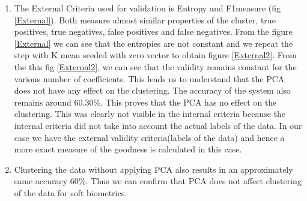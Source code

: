 \documentclass[conference]{IEEEtran}
\begin{document}
\begin{enumerate}
\item The External Criteria used for validation is Entropy and F1measure (fig \ref{External}).  Both measure almost similar properties of the cluster, true positives, true negatives, false positives and false negatives. From the figure \ref{External} we can see that the entropies are not constant and we repeat the step with K mean seeded with zero vector to obtain figure \ref{External2}. From the this fig \ref{External2}, we can see that the validity remains constant for the various number of coefficients. This leads us to understand that the PCA does not have any effect on the clustering. The accuracy of the system also remains around 60.30\%. This proves that the PCA has no effect on the clustering. This was clearly not visible in the internal criteria because the internal criteria did not take into account the actual labels of the data. In our case we have the external validity criteria(labels of the data)  and hence a more exact measure of the goodness is calculated in this case. 
\item Clustering the data without applying PCA also results in an approximately same accuracy 60\%. Thus we can confirm that PCA does not affect clustering of the data for soft biometrics.  


\end{enumerate}
%
%
\end{document}

